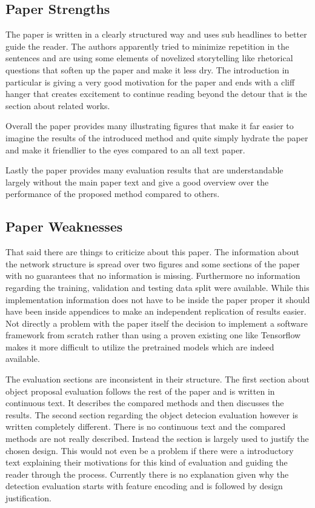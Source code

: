 \documentclass[12pt]{scrartcl}
\begin{document}
\subsection{Paper Strengths} %
\label{sub:paper_strengths}

The paper is written in a clearly structured way and uses sub headlines to
better guide the reader. The authors apparently tried to minimize repetition
in the sentences and are using some elements of novelized storytelling like
rhetorical questions that soften up the paper and make it less dry. The introduction
in particular is giving a very good motivation for the paper and ends with a cliff
hanger that creates excitement to continue reading beyond the detour that is
the section about related works.

Overall the paper provides many illustrating figures that make it far easier
to imagine the results of the introduced method and quite simply hydrate the
paper and make it friendlier to the eyes compared to an all text paper.

Lastly the paper provides many evaluation results that are understandable
largely without the main paper text and give a good overview over the performance
of the proposed method compared to others.


\subsection{Paper Weaknesses} %
\label{sub:paper_weaknesses}

That said there are things to criticize about this paper. The information about
the network structure is spread over two figures and some sections of the paper
with no guarantees that no information is missing. Furthermore no information
regarding the training, validation and testing data split were available. While
this implementation information does not have to be inside the paper proper it
should have been inside appendices to make an independent replication of results
easier. Not directly a problem with the paper itself the decision to implement
a software framework from scratch rather than using a proven existing one like
Tensorflow makes it more difficult to utilize the pretrained models which are
indeed available.

The evaluation sections are inconsistent in their structure. The first section
about object proposal evaluation follows the rest of the paper and is written
in continuous text. It describes the compared methods and then discusses the
results. The second section regarding the object detecion evaluation however
is written completely different. There is no continuous text and the compared
methods are not really described. Instead the section is largely used to justify
the chosen design. This would not even be a problem if there were a introductory
text explaining their motivations for this kind of evaluation and guiding the
reader through the process. Currently there is no explanation given why
the detection evaluation starts with feature encoding and is followed by
design justification.
\end{document}

